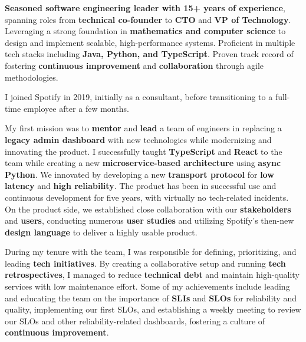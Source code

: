 
\textbf{Seasoned software engineering leader with 15+ years of experience}, spanning roles from \textbf{technical co-founder} to \textbf{CTO} and \textbf{VP of Technology}. Leveraging a strong foundation in \textbf{mathematics and computer science} to design and implement scalable, high-performance systems. Proficient in multiple tech stacks including \textbf{Java, Python, and TypeScript}. Proven track record of fostering \textbf{continuous improvement} and \textbf{collaboration} through agile methodologies.

\vspace{1cm}

\small
I joined Spotify in 2019, initially as a consultant, before transitioning to a full-time employee after a few months.
\smallskip

My first mission was to \textbf{mentor} and \textbf{lead} a team of engineers in replacing a \textbf{legacy admin dashboard} with new technologies while modernizing and innovating the product. I successfully taught \textbf{TypeScript} and \textbf{React} to the team while creating a new \textbf{microservice-based architecture} using \textbf{async Python}. We innovated by developing a new \textbf{transport protocol} for \textbf{low latency} and \textbf{high reliability}. The product has been in successful use and continuous development for five years, with virtually no tech-related incidents. On the product side, we established close collaboration with our \textbf{stakeholders} and \textbf{users}, conducting numerous \textbf{user studies} and utilizing Spotify's then-new \textbf{design language} to deliver a highly usable product.
\smallskip

During my tenure with the team, I was responsible for defining, prioritizing, and leading \textbf{tech initiatives}. By creating a collaborative setup and running \textbf{tech retrospectives}, I managed to reduce \textbf{technical debt} and maintain high-quality services with low maintenance effort. Some of my achievements include leading and educating the team on the importance of \textbf{SLIs} and \textbf{SLOs} for reliability and quality, implementing our first SLOs, and establishing a weekly meeting to review our SLOs and other reliability-related dashboards, fostering a culture of \textbf{continuous improvement}.
\smallskip

